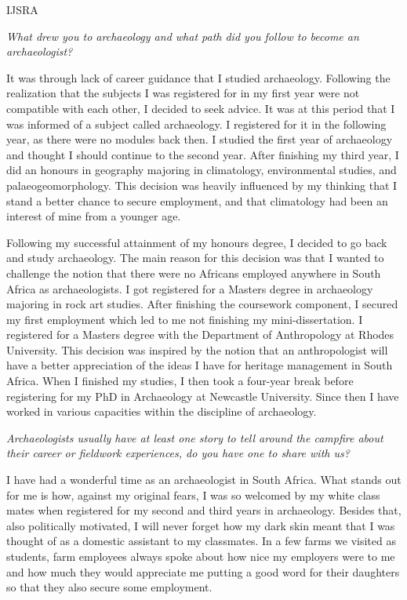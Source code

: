 \begin{labeling}{IJSRA}	
\item[IJSRA (International Journal of Student Research in Archaeology)] \emph{What drew you to archaeology and what path did you follow to become an archaeologist?}
	
\item[Ndukuyakhe Ndlovu (NN)]
It was through lack of career guidance that I studied archaeology. Following the realization that the subjects I was registered for in my first year were not compatible with each other, I decided to seek advice. It was at this period that I was informed of a subject called archaeology. I registered for it in the following year, as there were no modules back then. I studied the first year of archaeology and thought I should continue to the second year. After finishing my third year, I did an honours in geography majoring in climatology, environmental studies, and palaeogeomorphology. This decision was heavily influenced by my thinking that I stand a better chance to secure employment, and that climatology had been an interest of mine from a younger age.

Following my successful attainment of my honours degree, I decided to go back and study archaeology. The main reason for this decision was that I wanted to challenge the notion that there were no Africans employed anywhere in South Africa as archaeologists. I got registered for a Masters degree in archaeology majoring in rock art studies. After finishing the coursework component, I secured my first employment which led to me not finishing my mini-dissertation. I registered for a Masters degree with the Department of Anthropology at Rhodes University. This decision was inspired by the notion that an anthropologist will have a better appreciation of the ideas I have for heritage management in South Africa. When I finished my studies, I then took a four-year break before registering for my PhD in Archaeology at Newcastle University. Since then I have worked in various capacities within the discipline of archaeology.

\item[IJSRA] \emph{Archaeologists usually have at least one story to tell around the campfire about their career or fieldwork experiences, do you have one to share with us?}
	
\item[NN]
I have had a wonderful time as an archaeologist in South Africa. What stands out for me is how, against my original fears, I was so welcomed by my white class mates when registered for my second and third years in archaeology. Besides that, also politically motivated, I will never forget how my dark skin meant that I was thought of as a domestic assistant to my classmates. In a few farms we visited as students, farm employees always spoke about how nice my employers were to me and how much they would appreciate me putting a good word for their daughters so that they also secure some employment.


\end{labeling}
